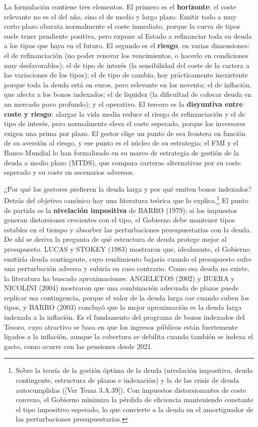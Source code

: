 \documentclass[10pt,a4paper]{article}
\newcommand{\authorfont}[1]{{\fontfamily{EBGaramond-TLF}\selectfont #1}}
\begin{document}
La formulación contiene tres elementos. El primero es el \textbf{horizonte}: el coste relevante no es el del año, sino el de medio y largo plazo. Emitir todo a muy corto plazo abarata normalmente el coste inmediato, porque la curva de tipos suele tener pendiente positiva, pero expone al Estado a refinanciar toda su deuda a los tipos que haya en el futuro. El segundo es el \textbf{riesgo}, en varias dimensiones: el de refinanciación (no poder renovar los vencimientos, o hacerlo en condiciones muy desfavorables); el de tipo de interés (la sensibilidad del coste de la cartera a las variaciones de los tipos); el de tipo de cambio, hoy prácticamente inexistente porque toda la deuda está en euros, pero relevante en los noventa; el de inflación, que afecta a los bonos indexados; el de liquidez (la dificultad de colocar deuda en un mercado poco profundo); y el operativo. El tercero es la \textbf{disyuntiva entre coste y riesgo}: alargar la vida media reduce el riesgo de refinanciación y el de tipo de interés, pero normalmente eleva el coste esperado, porque los inversores exigen una prima por plazo. El gestor elige un punto de esa frontera en función de su aversión al riesgo, y ese punto es el núcleo de su estrategia; el FMI y el Banco Mundial lo han formalizado en su marco de estrategia de gestión de la deuda a medio plazo (MTDS), que compara carteras alternativas por su coste esperado y su coste en escenarios adversos.

¿Por qué los gestores prefieren la deuda larga y por qué emiten bonos indexados? Detrás del objetivo canónico hay una literatura teórica que lo explica.\footnote{Sobre la teoría de la gestión óptima de la deuda (nivelación impositiva, deuda contingente, estructura de plazos e indexación) y la de las crisis de deuda autocumplidas ([\authorfont{Ver Tema 3.A.39}]). Con impuestos distorsionantes de coste convexo, el Gobierno minimiza la pérdida de eficiencia manteniendo constante el tipo impositivo esperado, lo que convierte a la deuda en el amortiguador de las perturbaciones presupuestarias.
} El punto de partida es la \textbf{nivelación impositiva} de BARRO (1979): si los impuestos generan distorsiones crecientes con el tipo, el Gobierno debe mantener tipos estables en el tiempo y absorber las perturbaciones presupuestarias con la deuda. De ahí se deriva la pregunta de qué estructura de deuda protege mejor al presupuesto. LUCAS y STOKEY (1983) mostraron que, idealmente, el Gobierno emitiría deuda contingente, cuyo rendimiento bajaría cuando el presupuesto sufre una perturbación adversa y subiría en caso contrario. Como esa deuda no existe, la literatura ha buscado aproximaciones: ANGELETOS (2002) y BUERA y NICOLINI (2004) mostraron que una combinación adecuada de plazos puede replicar esa contingencia, porque el valor de la deuda larga cae cuando suben los tipos, y BARRO (2003) concluyó que la mejor aproximación es la deuda larga indexada a la inflación. Es el fundamento del programa de bonos indexados del Tesoro, cuyo atractivo se basa en que los ingresos públicos están fuertemente ligados a la inflación, aunque la cobertura se debilita cuando también se indexa el gasto, como ocurre con las pensiones desde 2021.
\end{document}
